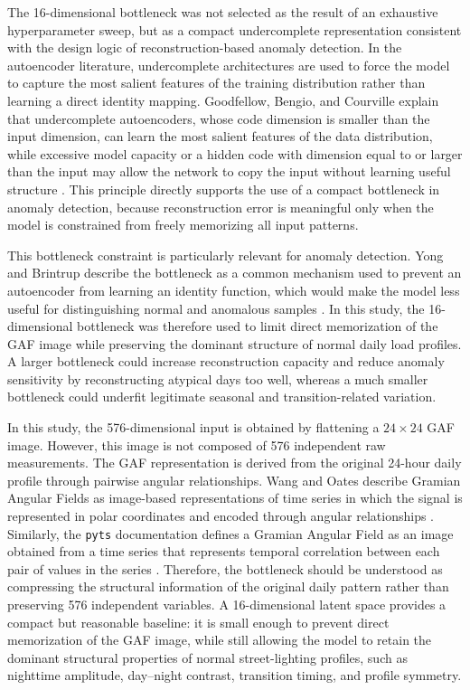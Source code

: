 \documentclass{article}
\begin{document}
The 16-dimensional bottleneck was not selected as the result of an exhaustive hyperparameter sweep, but as a compact undercomplete representation consistent with the design logic of reconstruction-based anomaly detection. In the autoencoder literature, undercomplete architectures are used to force the model to capture the most salient features of the training distribution rather than learning a direct identity mapping. Goodfellow, Bengio, and Courville explain that undercomplete autoencoders, whose code dimension is smaller than the input dimension, can learn the most salient features of the data distribution, while excessive model capacity or a hidden code with dimension equal to or larger than the input may allow the network to copy the input without learning useful structure \cite{goodfellow2016deep}. This principle directly supports the use of a compact bottleneck in anomaly detection, because reconstruction error is meaningful only when the model is constrained from freely memorizing all input patterns.

This bottleneck constraint is particularly relevant for anomaly detection. Yong and Brintrup describe the bottleneck as a common mechanism used to prevent an autoencoder from learning an identity function, which would make the model less useful for distinguishing normal and anomalous samples \cite{yong2022bottleneck}. In this study, the 16-dimensional bottleneck was therefore used to limit direct memorization of the GAF image while preserving the dominant structure of normal daily load profiles. A larger bottleneck could increase reconstruction capacity and reduce anomaly sensitivity by reconstructing atypical days too well, whereas a much smaller bottleneck could underfit legitimate seasonal and transition-related variation.

In this study, the 576-dimensional input is obtained by flattening a $24 \times 24$ GAF image. However, this image is not composed of 576 independent raw measurements. The GAF representation is derived from the original 24-hour daily profile through pairwise angular relationships. Wang and Oates describe Gramian Angular Fields as image-based representations of time series in which the signal is represented in polar coordinates and encoded through angular relationships \cite{wang2015imaging}. Similarly, the \texttt{pyts} documentation defines a Gramian Angular Field as an image obtained from a time series that represents temporal correlation between each pair of values in the series \cite{pytsGAF}. Therefore, the bottleneck should be understood as compressing the structural information of the original daily pattern rather than preserving 576 independent variables. A 16-dimensional latent space provides a compact but reasonable baseline: it is small enough to prevent direct memorization of the GAF image, while still allowing the model to retain the dominant structural properties of normal street-lighting profiles, such as nighttime amplitude, day--night contrast, transition timing, and profile symmetry.
\end{document}
